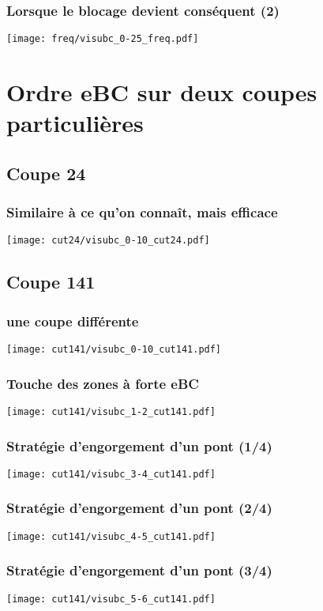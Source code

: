 \documentclass[aspectratio=169]{beamer}
\begin{document}
    \begin{frame}
        \frametitle{Lorsque le blocage devient conséquent (2)}
        \texttt{[image: freq/visubc\_0-25\_freq.pdf]}
    \end{frame}

    \section{Ordre eBC sur deux coupes particulières}
    \subsection{Coupe 24}
    
    \begin{frame}
        \frametitle{Similaire à ce qu'on connaît, mais efficace}
        \texttt{[image: cut24/visubc\_0-10\_cut24.pdf]}
    \end{frame}

    \subsection{Coupe 141}
    \begin{frame}
        \frametitle{une coupe différente}
        \texttt{[image: cut141/visubc\_0-10\_cut141.pdf]}
    \end{frame}

    \begin{frame}
        \frametitle{Touche des zones à forte eBC}
        \texttt{[image: cut141/visubc\_1-2\_cut141.pdf]}
    \end{frame}

    \begin{frame}
        \frametitle{Stratégie d'engorgement d'un pont (1/4)}
        \texttt{[image: cut141/visubc\_3-4\_cut141.pdf]}
    \end{frame}

    \begin{frame}
        \frametitle{Stratégie d'engorgement d'un pont (2/4)}
        \texttt{[image: cut141/visubc\_4-5\_cut141.pdf]}
    \end{frame}

    \begin{frame}
        \frametitle{Stratégie d'engorgement d'un pont (3/4)}
        \texttt{[image: cut141/visubc\_5-6\_cut141.pdf]}
    \end{frame}
\end{document}
